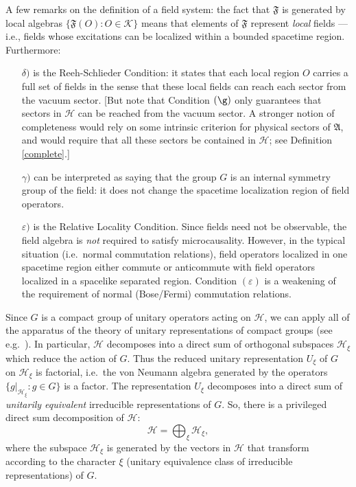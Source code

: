 \documentclass[11pt]{article}
\theoremstyle{definition}
\theoremstyle{definition}
\theoremstyle{remark}
\newcommand{\ve}{\varepsilon}
\def\2#1{{\mathcal #1}}
\def\al#1{{\mathfrak #1}}
\begin{document}
A few remarks on the definition of a field system: the
fact that $\al F$ is generated by local algebras $\{
\al F (O):O\in \2K \}$ means that elements of $\al F$
represent \emph{local} fields --- i.e., fields whose
excitations can be localized within a bounded spacetime
region.  Furthermore:

\begin{itemize} 
\item[$\delta )$] is the Reeh-Schlieder Condition: it
  states that each local region $O$ carries a full set
  of fields in the sense that these local fields can
  reach each sector from the vacuum sector.  [But note
  that Condition $(\g )$ only guarantees that sectors
  in $\2H$ can be reached from the vacuum sector.  A
  stronger notion of completeness would rely on some
  intrinsic criterion for physical sectors of $\al A$,
  and would require that all these sectors be contained
  in $\2H$; see Definition \ref{complete}.]
\item[$\gamma )$] can be interpreted as saying that the
  group $G$ is an internal symmetry group of the field:
  it does not change the spacetime localization region
  of field operators.
\item[$\ve )$] is the Relative Locality Condition.  Since fields need
  not be observable, the field algebra is \emph{not} required to
  satisfy microcausality.  However, in the typical situation (i.e.\
  normal commutation relations), field operators localized in one
  spacetime region either commute or anticommute with field operators
  localized in a spacelike separated region.  Condition $(\ve )$ is a
  weakening of the requirement of normal (Bose/Fermi) commutation
  relations.
\end{itemize}

Since $G$ is a compact group of unitary operators
acting on $\2H$, we can apply all of the apparatus of
the theory of unitary representations of compact groups
(see e.g.\ \cite{folland}).  In particular, $\2H$
decomposes into a direct sum of orthogonal subspaces
$\2H _{\xi}$ which reduce the action of $G$.  Thus the
reduced unitary representation $U_{\xi}$ of $G$ on $\2H
_\xi$ is factorial, i.e.\ the von Neumann algebra
generated by the operators $\{ g|_{\2H _\xi}:g\in G\}$
is a factor.  The representation $U_{\xi}$ decomposes
into a direct sum of \emph{unitarily equivalent}
irreducible representations of $G$.  So, there is a
privileged direct sum decomposition of $\2H$:
$$ \2H = \bigoplus _{\xi} \2H _{\xi} ,$$
where the subspace $\2H _{\xi}$ is generated by the vectors in $\2H$
that transform according to the character $\xi$ (unitary equivalence
class of irreducible representations) of $G$.
\end{document}
